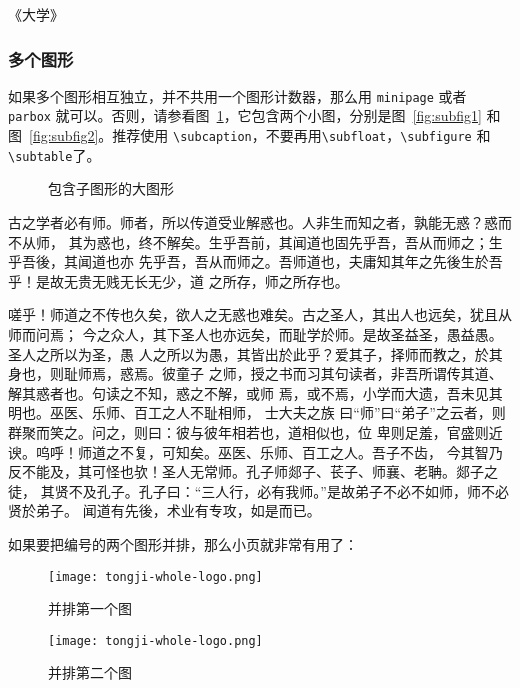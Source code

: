\hfill \pozhehao《大学》


\subsubsection{多个图形}
\label{sec:multifig}

如果多个图形相互独立，并不共用一个图形计数器，那么用 \verb|minipage| 或者
\verb|parbox| 就可以。否则，请参看图~\ref{fig:big1}，它包含两个小图，分别是图~\ref{fig:subfig1}
和图~\ref{fig:subfig2}。推荐使用 \verb|\subcaption|，不要再用\verb|\subfloat|，\verb|\subfigure| 和 \verb|\subtable|了。
\begin{figure} %
  \centering%
  \hspace{4em}%
  \caption{包含子图形的大图形}
  \label{fig:big1}
\end{figure}

古之学者必有师。师者，所以传道受业解惑也。人非生而知之者，孰能无惑？惑而不从师，
其为惑也，终不解矣。生乎吾前，其闻道也固先乎吾，吾从而师之；生乎吾後，其闻道也亦
先乎吾，吾从而师之。吾师道也，夫庸知其年之先後生於吾乎！是故无贵无贱无长无少，道
之所存，师之所存也。

嗟乎！师道之不传也久矣，欲人之无惑也难矣。古之圣人，其出人也远矣，犹且从师而问焉；
今之众人，其下圣人也亦远矣，而耻学於师。是故圣益圣，愚益愚。圣人之所以为圣，愚
人之所以为愚，其皆出於此乎？爱其子，择师而教之，於其身也，则耻师焉，惑焉。彼童子
之师，授之书而习其句读者，非吾所谓传其道、解其惑者也。句读之不知，惑之不解，或师
焉，或不焉，小学而大遗，吾未见其明也。巫医、乐师、百工之人不耻相师，  士大夫之族
曰“师”曰“弟子”之云者，则群聚而笑之。问之，则曰：彼与彼年相若也，道相似也，位
卑则足羞，官盛则近谀。呜呼！师道之不复，可知矣。巫医、乐师、百工之人。吾子不齿，
今其智乃反不能及，其可怪也欤！圣人无常师。孔子师郯子、苌子、师襄、老聃。郯子之徒，
其贤不及孔子。孔子曰：“三人行，必有我师。”是故弟子不必不如师，师不必贤於弟子。
闻道有先後，术业有专攻，如是而已。

如果要把编号的两个图形并排，那么小页就非常有用了：
\begin{figure}
\begin{minipage}{0.48\textwidth}
  \centering
  \texttt{[image: tongji-whole-logo.png]}
  \caption{并排第一个图}
  \label{fig:parallel1}
\end{minipage}\hfill
\begin{minipage}{0.48\textwidth}
  \centering
  \texttt{[image: tongji-whole-logo.png]}
  \caption{并排第二个图}
  \label{fig:parallel2}
\end{minipage}
\end{figure}

